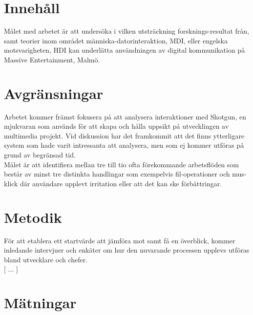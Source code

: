 \documentclass{article}
\begin{document}
\section*{Innehåll}
  Målet med arbetet är att undersöka i vilken utsträckning forsknings-resultat
  från, samt teorier inom området människa-datorinteraktion, MDI\cite{c_mdi},
  eller engelska motsvarigheten, HDI\cite{c_hci} kan underlätta användningen av
  digital kommunikation på Massive Entertainment\cite{c_massive}, Malmö.

\section*{Avgränsningar}

  Arbetet kommer främst fokusera på att analysera interaktioner med
  Shotgun\cite{c_shotgun}, en mjukvaran som används för att skapa och hålla
  uppsikt på utvecklingen av multimedia projekt. Vid diskussion har det framkommit
  att det finns ytterligare system som hade varit intressanta att analysera,
  men som ej kommer utföras på grund av begränsad tid. \\

  Målet är att identifiera mellan tre till tio ofta förekommande arbetsflöden
  som består av minst tre distinkta handlingar som exempelvis fil-operationer
  och mus-klick där användare upplevt irritation eller att det kan ske
  förbättringar.

\section*{Metodik}

  För att etablera ett startvärde att jämföra mot samt få en överblick, kommer
  inledande intervjuer och enkäter om hur den nuvarande processen upplevs
  utföras bland utvecklare och chefer. \\

  [ ... ]






\newpage
\section*{Mätningar}
\end{document}
